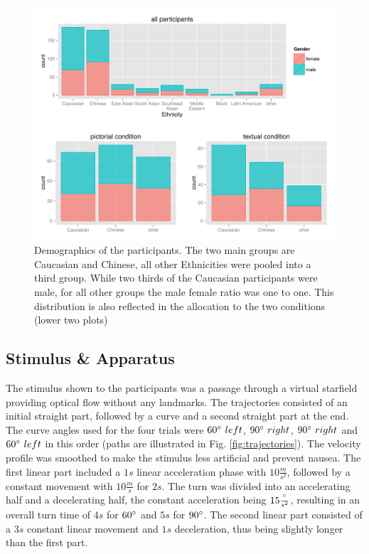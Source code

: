\documentclass{frontiersSCNS} %
\begin{document}
\begin{figure}[h!]
  \centering
    \includegraphics[width=\textwidth]{figures/participants.pdf}
   \caption{ \footnotesize Demographics of the participants. The two main groups are Caucasian and Chinese, all other Ethnicities were pooled into a third group. While two thirds of the Caucasian participants were male, for all other groups the male female ratio was one to one. This distribution is also reflected in the allocation to the two conditions (lower two plots)}
   \label{fig:demographics}
\end{figure}

\subsection{Stimulus \& Apparatus}
The stimulus shown to the participants was a passage through a virtual starfield providing optical flow without any landmarks. The trajectories consisted of an initial straight part, followed by a curve and a second straight part at the end. The curve angles used for the four trials were $60 \degree \ left$, $90 \degree \ right$, $90 \degree \ right$ and $60\degree \ left$ in this order (paths are illustrated in Fig. \ref{fig:trajectories}). The velocity profile was smoothed to make the stimulus less artificial and prevent nausea. The first linear part included a $1s$ linear acceleration phase with $10 \frac{m}{s^2}$, followed by a constant movement with $10 \frac{m}{s}$ for $2s$. The turn was divided into an accelerating half and a decelerating half, the constant acceleration being $15 \frac{\degree}{s^2}$, resulting in an overall turn time of $4s$ for $60 \degree$ and $5s$ for $90 \degree$. The second linear part consisted of a $3s$ constant linear movement and $1s$ deceleration, thus being slightly longer than the first part. 
\end{document}
